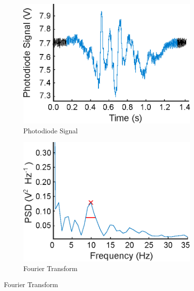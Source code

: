 \documentclass{physics_article_B}
\begin{document}
         \vspace{0.2cm}\begin{figure}[H]
            \centering   
            \begin{subfigure}[b]{0.48\textwidth}
                \hspace*{0cm}\includegraphics[width=\textwidth]{Figures/PingSignal.eps}
                \caption{Photodiode Signal}
                \label{fig:oscillation:signal}
            \end{subfigure}\hspace{3pt}
            \begin{subfigure}[b]{0.48\textwidth}
                \hspace*{0.1cm}\includegraphics[width=\textwidth]{Figures/PingPD.eps}
                \caption{Fourier Transform}

\end{subfigure}
\end{figure}
\end{document}
